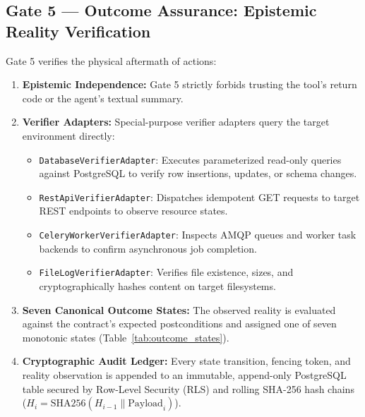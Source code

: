 \documentclass[11pt,a4paper]{article}
\begin{document}
\subsection{Gate 5 — Outcome Assurance: Epistemic Reality Verification}
Gate 5 verifies the physical aftermath of actions:
\begin{enumerate}[leftmargin=*,itemsep=2pt]
  \item \textbf{Epistemic Independence:} Gate 5 strictly forbids trusting the tool's return code or the agent's textual summary.
  \item \textbf{Verifier Adapters:} Special-purpose verifier adapters query the target environment directly:
  \begin{itemize}[leftmargin=*,itemsep=1pt]
    \item \texttt{DatabaseVerifierAdapter}: Executes parameterized read-only queries against PostgreSQL to verify row insertions, updates, or schema changes.
    \item \texttt{RestApiVerifierAdapter}: Dispatches idempotent GET requests to target REST endpoints to observe resource states.
    \item \texttt{CeleryWorkerVerifierAdapter}: Inspects AMQP queues and worker task backends to confirm asynchronous job completion.
    \item \texttt{FileLogVerifierAdapter}: Verifies file existence, sizes, and cryptographically hashes content on target filesystems.
  \end{itemize}
  \item \textbf{Seven Canonical Outcome States:} The observed reality is evaluated against the contract's expected postconditions and assigned one of seven monotonic states (Table~\ref{tab:outcome_states}).
  \item \textbf{Cryptographic Audit Ledger:} Every state transition, fencing token, and reality observation is appended to an immutable, append-only PostgreSQL table secured by Row-Level Security (RLS) and rolling SHA-256 hash chains ($H_i = \text{SHA256}(H_{i-1} \parallel \text{Payload}_i)$).
\end{enumerate}
\end{document}
